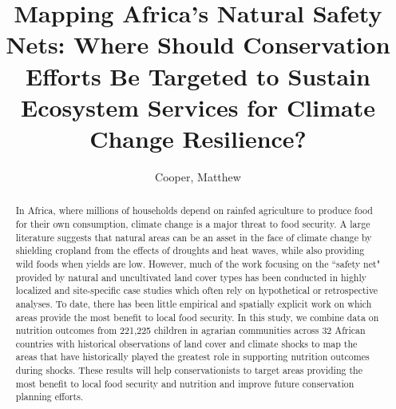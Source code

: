 \documentclass{article}
\begin{document}
\title{Mapping Africa's Natural Safety Nets: Where Should Conservation Efforts Be Targeted to Sustain Ecosystem Services for Climate Change Resilience?}

\author{
	Cooper, Matthew\\
}



  


\maketitle
\begin{abstract}

In Africa, where millions of households depend on rainfed agriculture to produce food for their own consumption, climate change is a major threat to food security.  A large literature suggests that natural areas can be an asset in the face of climate change by shielding cropland from the effects of droughts and heat waves, while also providing wild foods when yields are low.  However, much of the work focusing on the ``safety net" provided by natural and uncultivated land cover types has been conducted in highly localized and site-specific case studies which often rely on hypothetical or retrospective analyses.  To date, there has been little empirical and spatially explicit work on which areas provide the most benefit to local food security.  In this study, we combine data on nutrition outcomes from 221,225 children in agrarian communities across 32 African countries with historical observations of land cover and climate shocks to map the areas that have historically played the greatest role in supporting nutrition outcomes during shocks.  These results will help conservationists to target areas providing the most benefit to local food security and nutrition and improve future conservation planning efforts.

\end{abstract}
\end{document}
